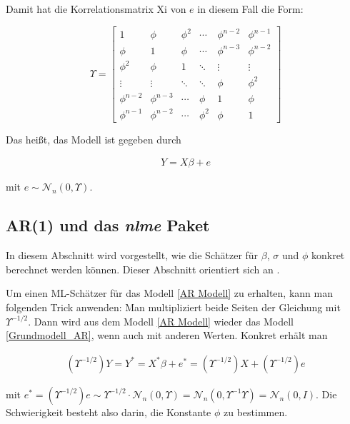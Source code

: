 \documentclass[12pt,a4paper]{article}
\theoremstyle{definition}
\theoremstyle{definition}
\theoremstyle{definition}
\theoremstyle{definition}
\begin{document}
Damit hat die Korrelationsmatrix \gls{Xi} von $e$ in diesem Fall die Form:

\begin{equation}\label{Upsilon}
\Upsilon = 
\left[
   \begin{array}{cccccc}
     1 				& \phi 			& \phi^2	& \cdots	& \phi^{n-2}	& \phi^{n-1} 	\\
     \phi 			& 1		 		& \phi 		& \cdots	& \phi^{n-3}	& \phi^{n-2} 	\\
     \phi^2 		& \phi 			& 1		 	& \ddots	& \vdots		& \vdots 		\\
     \vdots		 	& \vdots	 	& \ddots	& \ddots	& \phi			& \phi^{2} 	\\
     \phi^{n-2} 	& \phi^{n-3}	& \cdots 	& \phi		& 1				& \phi 		\\
     \phi^{n-1} 	& \phi^{n-2} 	& \cdots	& \phi^{2}	& \phi			& 1  
   \end{array}
\right]
\end{equation}

Das heißt, das Modell ist gegeben durch 

\begin{align} \label{AR Modell}
Y = X \beta + e
\end{align}

mit $e \sim \mathscr{N}_{n}(0,\Upsilon)$.



\subsection{AR(1) und das \textit{nlme} Paket}
\label{AR(1) und das nlme Paket}

In diesem Abschnitt wird vorgestellt, wie die Schätzer für $\beta$, $\sigma$ und $\phi$ konkret berechnet werden können. Dieser Abschnitt orientiert sich an \cite[203-205]{Pinheiro00}.

Um einen ML-Schätzer für das Modell \eqref{AR Modell} zu erhalten, kann man folgenden Trick anwenden: Man multipliziert beide Seiten der Gleichung mit $\Upsilon^{-1/2}$. Dann wird aus dem Modell \eqref{AR Modell} wieder das Modell \eqref{Grundmodell_AR}, wenn auch mit anderen Werten. Konkret erhält man

\begin{align} \label{AR rück}
(\Upsilon^{-1/2})Y = Y^{*} = X^{*} \beta + e^{*} = (\Upsilon^{-1/2})X + (\Upsilon^{-1/2})e
\end{align}

mit $e^{*} = (\Upsilon^{-1/2})e \sim \Upsilon^{-1/2} \cdot \mathscr{N}_{n}(0,\Upsilon) = \mathscr{N}_{n}(0,\Upsilon^{-1}\Upsilon) = \mathscr{N}_{n}(0,I)$. Die Schwierigkeit besteht also darin, die Konstante $\phi$ zu bestimmen. 
\end{document}
